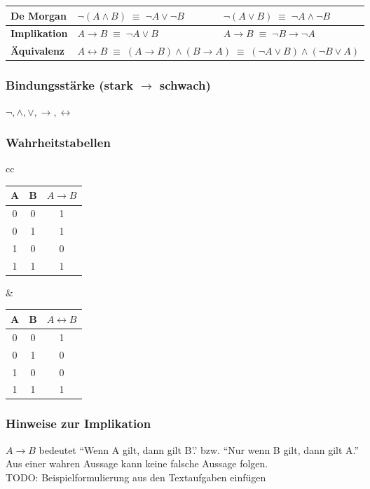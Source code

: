\documentclass[6pt,a4paper]{scrartcl}
\begin{document}
\begin{multicols*}{3}
\begin{tabular}{l|l|l}
	\hline
	\textbf{De Morgan}	& $\neg (A \land B) \; \equiv \; \neg A \lor \neg B$ & $\neg (A \lor B) \; \equiv \; \neg A \land \neg B$ \\
	\hline
	\textbf{Implikation}	& $A \rightarrow B \; \equiv \; \neg A \lor B$ & $A \rightarrow B \; \equiv \; \neg B \rightarrow \neg A$ \\
	\hline
	\textbf{Äquivalenz}	& \multicolumn{2}{l}{$A \leftrightarrow B \; \equiv \; (A \rightarrow B) \land (B \rightarrow A) \; \equiv \; (\neg A \lor B) \land (\neg B \lor A) $} \\	
\end{tabular}

\subsubsection{Bindungsstärke (stark $\rightarrow$ schwach)}
$\neg, \land, \lor, \rightarrow, \leftrightarrow$

\subsubsection{Wahrheitstabellen}
\begin{tabular}{cc}
	\begin{tabular}{cc|c}
	A & B & $A \rightarrow B$ \\
	\hline
	0 & 0 & 1 \\
	0 & 1 & 1 \\
	1 & 0 & 0 \\
	1 & 1 & 1 \\
	\end{tabular}
	&
	\begin{tabular}{cc|c}
	A & B & $A \leftrightarrow B$ \\
	\hline
	0 & 0 & 1 \\
	0 & 1 & 0 \\
	1 & 0 & 0 \\
	1 & 1 & 1 \\
	\end{tabular}
	
\end{tabular}
\subsubsection{Hinweise zur Implikation}
$A \rightarrow B$ bedeutet ``Wenn A gilt, dann gilt B'.' bzw. ``Nur wenn B gilt, dann gilt A.'' \\
Aus einer wahren Aussage kann keine falsche Aussage folgen.
\\TODO: Beispielformulierung aus den Textaufgaben einfügen


\end{multicols*}
\end{document}
